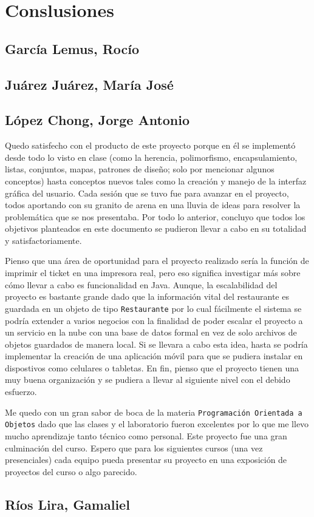 \section*{Conslusiones}

\subsection*{García Lemus, Rocío}

\subsection*{Juárez Juárez, María José}

\subsection*{López Chong, Jorge Antonio}
Quedo satisfecho con el producto de este proyecto porque en él se implementó desde todo lo visto en clase
(como la herencia, polimorfismo, encapsulamiento, listas, conjuntos, mapas, patrones de diseño; solo por
mencionar algunos conceptos) hasta conceptos nuevos tales como la creación y manejo de la interfaz
gráfica del usuario. Cada sesión que se tuvo fue para avanzar en el proyecto, todos aportando con su granito
de arena en una lluvia de ideas para resolver la problemática que se nos presentaba. Por todo lo anterior,
concluyo que todos los objetivos planteados en este documento se pudieron llevar a cabo en su totalidad y
satisfactoriamente.

Pienso que una área de oportunidad para el proyecto realizado sería la función de imprimir el ticket en una
impresora real, pero eso significa investigar más sobre cómo llevar a cabo es funcionalidad en Java. Aunque,
la escalabilidad del proyecto es bastante grande dado que la información vital del restaurante es guardada
en un objeto de tipo \texttt{Restaurante} por lo cual fácilmente el sistema se podría extender a varios
negocios con la finalidad de poder escalar el proyecto a un servicio en la nube con una base de datos formal
en vez de solo archivos de objetos guardados de manera local. Si se llevara a cabo esta idea, hasta se podría
implementar la creación de una aplicación móvil para que se pudiera instalar en dispostivos como celulares o
tabletas. En fin, pienso que el proyecto tienen una muy buena organización y se pudiera a llevar al siguiente
nivel con el debido esfuerzo.

Me quedo con un gran sabor de boca de la materia \texttt{Programación Orientada a Objetos} dado que las clases
y el laboratorio fueron excelentes por lo que me llevo mucho aprendizaje tanto técnico como personal. Este proyecto
fue una gran culminación del curso. Espero que para los siguientes cursos (una vez presenciales) cada equipo
pueda presentar su proyecto en una exposición de proyectos del curso o algo parecido.

\subsection*{Ríos Lira, Gamaliel}

